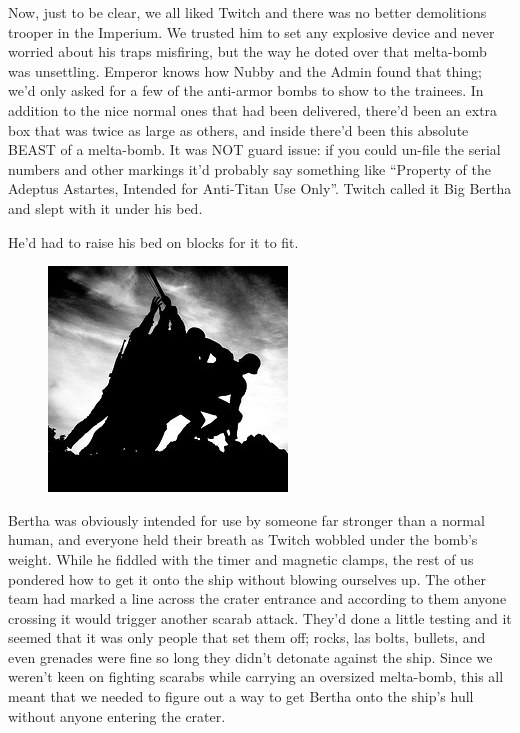 Now, just to be clear, we all liked Twitch and there was no better demolitions trooper in the Imperium. 
We trusted him to set any explosive device and never worried about his traps misfiring, but the way he doted over that melta-bomb was unsettling. 
Emperor knows how Nubby and the Admin found that thing; 
we’d only asked for a few of the anti-armor bombs to show to the trainees. 
In addition to the nice normal ones that had been delivered, there’d been an extra box that was twice as large as others, and inside there’d been this absolute BEAST of a melta-bomb. 
It was NOT guard issue: 
if you could un-file the serial numbers and other markings it’d probably say something like “Property of the Adeptus Astartes, Intended for Anti-Titan Use Only”. 
Twitch called it Big Bertha and slept with it under his bed.

He’d had to raise his bed on blocks for it to fit.

\begin{figure}
	\begin{center}
		\includegraphics[width=\figwidth]{pics/8/45.png}
	\end{center}
\end{figure}
Bertha was obviously intended for use by someone far stronger than a normal human, and everyone held their breath as Twitch wobbled under the bomb’s weight. 
While he fiddled with the timer and magnetic clamps, the rest of us pondered how to get it onto the ship without blowing ourselves up. 
The other team had marked a line across the crater entrance and according to them anyone crossing it would trigger another scarab attack. 
They’d done a little testing and it seemed that it was only people that set them off; 
rocks, las bolts, bullets, and even grenades were fine so long they didn't detonate against the ship. 
Since we weren’t keen on fighting scarabs while carrying an oversized melta-bomb, this all meant that we needed to figure out a way to get Bertha onto the ship’s hull without anyone entering the crater.

